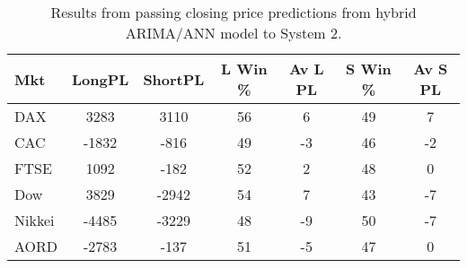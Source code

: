 \begin{table}[ht]
\centering
\caption[Results from passing closing price predictions from hybrid ARIMA/ANN model to System 2]{Results from passing closing price predictions from hybrid ARIMA/ANN model to System 2.} 
\label{tab:chp_ts:arima_ann_sys2}
\begin{tabular}{lcccccc}
  \toprule Mkt & LongPL & ShortPL & L Win \% & Av L PL & S Win \% & Av S PL \\ 
  \midrule DAX & 3283 & 3110 & 56 & 6 & 49 & 7 \\ 
  CAC & -1832 & -816 & 49 & -3 & 46 & -2 \\ 
  FTSE & 1092 & -182 & 52 & 2 & 48 & 0 \\ 
  Dow & 3829 & -2942 & 54 & 7 & 43 & -7 \\ 
  Nikkei & -4485 & -3229 & 48 & -9 & 50 & -7 \\ 
  AORD & -2783 & -137 & 51 & -5 & 47 & 0 \\ 
   \bottomrule \end{tabular}
\end{table}
